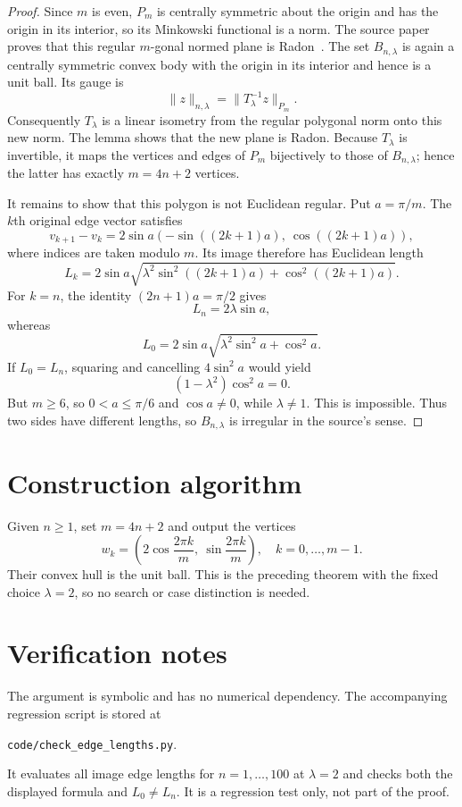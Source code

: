 \documentclass[11pt]{article}
\begin{document}
\begin{proof}
Since $m$ is even, $P_m$ is centrally symmetric about the origin and has the
origin in its interior, so its Minkowski functional is a norm.  The source
paper proves that this regular $m$-gonal normed plane is Radon~\cite[Theorem
2.7]{MSP}.  The set $B_{n,\lambda}$ is again a centrally symmetric convex body
with the origin in its interior and hence is a unit ball.  Its gauge is
\[
 \|z\|_{n,\lambda}=\|T_\lambda^{-1}z\|_{P_m}.
\]
Consequently $T_\lambda$ is a linear isometry from the regular polygonal norm
onto this new norm.  The lemma shows that the new plane is Radon.  Because
$T_\lambda$ is invertible, it maps the vertices and edges of $P_m$ bijectively
to those of $B_{n,\lambda}$; hence the latter has exactly $m=4n+2$ vertices.

It remains to show that this polygon is not Euclidean regular.  Put
$a=\pi/m$.  The $k$th original edge vector satisfies
\[
 v_{k+1}-v_k
 =2\sin a\left(-\sin((2k+1)a),\ \cos((2k+1)a)\right),
\]
where indices are taken modulo $m$.  Its image therefore has Euclidean length
\[
 L_k=2\sin a\sqrt{\lambda^2\sin^2((2k+1)a)
                         +\cos^2((2k+1)a)}.
\]
For $k=n$, the identity $(2n+1)a=\pi/2$ gives
\[
 L_n=2\lambda\sin a,
\]
whereas
\[
 L_0=2\sin a\sqrt{\lambda^2\sin^2a+\cos^2a}.
\]
If $L_0=L_n$, squaring and cancelling $4\sin^2a$ would yield
\[
 (1-\lambda^2)\cos^2a=0.
\]
But $m\geq6$, so $0<a\leq\pi/6$ and $\cos a\ne0$, while
$\lambda\ne1$.  This is impossible.  Thus two sides have different lengths,
so $B_{n,\lambda}$ is irregular in the source's sense.
\end{proof}

\section{Construction algorithm}

Given $n\geq1$, set $m=4n+2$ and output the vertices
\[
 \boxed{\quad
 w_k=\left(2\cos\frac{2\pi k}{m},\ \sin\frac{2\pi k}{m}\right),
 \quad k=0,\ldots,m-1.\quad}
\]
Their convex hull is the unit ball.  This is the preceding theorem with the
fixed choice $\lambda=2$, so no search or case distinction is needed.

\section{Verification notes}

The argument is symbolic and has no numerical dependency.  The accompanying
regression script is stored at
\begin{center}
\texttt{code/check\_edge\_lengths.py}.
\end{center}
It evaluates all image edge lengths for $n=1,\ldots,100$ at $\lambda=2$ and
checks both the displayed formula and $L_0\ne L_n$.  It is a regression test
only, not part of the proof.
\end{document}
